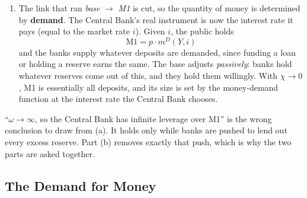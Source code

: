 \documentclass[12pt, letterpaper]{article}
\newcommand{\mD}{m^{D}}
\begin{document}
\begin{tcolorbox}[oddbox,title={Problem 10.3 \quad Interest on Reserves}]
\begin{enumerate}
\item The link that ran \emph{base} $\to$ \emph{M1} is cut, so the quantity of money is
determined by \textbf{demand}. The Central Bank's real instrument is now the interest rate it
pays (equal to the market rate $i$). Given $i$, the public holds
\[
\boxed{\text{M1}=p\cdot \mD(Y,i)}
\]
and the banks supply whatever deposits are demanded, since funding a loan or holding a reserve
earns the same. The base adjusts \emph{passively}: banks hold whatever reserves come out of
this, and they hold them willingly. With $\chi\to0$, M1 is essentially all deposits, and its
size is set by the money-demand function at the interest rate the Central Bank chooses.
\end{enumerate}

\begin{tcolorbox}[trapbox]
\small
``$\omega\to\infty$, so the Central Bank has infinite leverage over M1'' is the wrong
conclusion to draw from (a). It holds only while banks are pushed to lend out every excess
reserve. Part (b) removes exactly that push, which is why the two parts are asked together.
\end{tcolorbox}
\end{tcolorbox}

\subsection{The Demand for Money}
\end{document}
